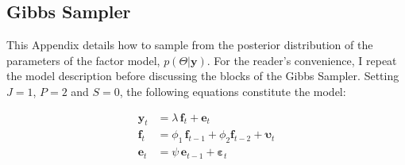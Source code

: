 \documentclass[notitlepage,a4paper,12pt]{article}
\begin{document}
\begin{ThreePartTable}
\pagebreak
\newpage

\section{Gibbs Sampler}
\label{app:gibbssampler}
\normalsize
This Appendix details how to sample from the posterior distribution of the parameters of the factor model, $p(\Theta|\mathbf{y})$. For the reader's convenience, I repeat the model description before discussing the blocks of the Gibbs Sampler. Setting $J=1$, $P=2$ and $S=0$, the following equations constitute the model:

\begin{subequations}
    \label{eqn:app_model}
    \begin{align}
        \mathbf{y}_t &=  \lambda \, \mathbf{f}_{t} + \mathbf{e}_t \label{eqn:app_facmod_obs}\\ 
        \mathbf{f}_t &= \phi_1 \, \mathbf{f}_{t-1} + \phi_2 \mathbf{f}_{t-2} + \boldsymbol{\upsilon}_t \label{eqn:app_facmod_factors}\\
        \mathbf{e}_t &= \psi \, \mathbf{e}_{t-1} + \boldsymbol{\varepsilon}_t \label{eqn:app_facmod_idios}
    \end{align}
\end{subequations}


\end{ThreePartTable}
\end{document}
